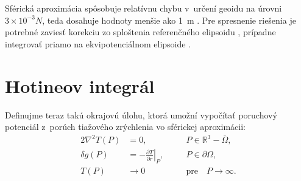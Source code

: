 \documentclass[a4paper, 12pt]{book}
\begin{document}
Sférická aproximácia spôsobuje relatívnu chybu v~určení geoidu na úrovni~$3 
\times 10^{-3} N$, teda dosahuje hodnoty menšie ako 1~m 
\parencite{MoritzPhysicalGeodesy}.  Pre spresnenie riešenia je potrebné zaviesť 
korekciu zo sploštenia referenčného elipsoidu \parencite[pozri 
napríklad][]{Claessens2006}, prípadne integrovať priamo na ekvipotenciálnom 
elipsoide \parencite{Martinec1997}.


\section{Hotineov integrál}
\label{sec:hotine_integral}

Definujme teraz takú okrajovú úlohu, ktorá umožní vypočítať poruchový potenciál 
z~porúch tiažového zrýchlenia vo sférickej aproximácii:
%
\begin{alignat}{2}
\nabla^2 T(P) &= 0{,} &&P \in \mathbb{R}^3 
- \overline\Omega{,}\label{eq:bvp_dg_laplace}\\
\delta g(P) &= -\left.\frac{\partial T}{\partial r}\right|_P{,} \quad &&P \in 
\partial\Omega{,}\label{eq:bvp_dg_boundary_condition}\\
T(P) &\rightarrow 0 &&\textrm{pre} \quad P \rightarrow 
\infty{.}\label{eq:bvp_dg_t_infty}
\end{alignat}
\end{document}
